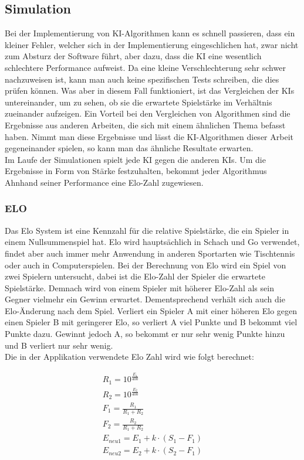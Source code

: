 \documentclass[12pt,a4paper,bibliography=totocnumbered,listof=totocnumbered]{article}
\begin{document}
\subsection{Simulation}
Bei der Implementierung von KI-Algorithmen kann es schnell passieren, dass ein kleiner Fehler, welcher sich in der Implementierung eingeschlichen hat, 
zwar nicht zum Absturz der Software führt, aber dazu, dass die KI eine wesentlich schlechtere Performance aufweist. Da eine kleine Verschlechterung 
sehr schwer nachzuweisen ist, kann man auch keine spezifischen Tests schreiben, die dies prüfen können. Was aber in diesem Fall funktioniert, 
ist das Vergleichen der KIs untereinander, um zu sehen, ob sie die erwartete Spielstärke im Verhältnis zueinander aufzeigen.
Ein Vorteil bei den Vergleichen von Algorithmen sind die Ergebnisse aus anderen Arbeiten, die sich mit einem ähnlichen Thema befasst haben.
Nimmt man diese Ergebnisse und lässt die KI-Algorithmen dieser Arbeit gegeneinander spielen, so kann man das ähnliche Resultate erwarten.
\\
Im Laufe der Simulationen spielt jede KI gegen die anderen KIs. Um die Ergebnisse in Form von Stärke festzuhalten, bekommt jeder Algorithmus Ahnhand
seiner Performance eine Elo-Zahl zugewiesen.

\subsubsection{ELO}
Das Elo System ist eine Kennzahl für die relative Spielstärke, die ein Spieler in einem Nullsummenspiel hat. Elo wird hauptsächlich in Schach und Go verwendet,
findet aber auch immer mehr Anwendung in anderen Sportarten wie Tischtennis oder auch in Computerspielen. Bei der Berechnung von Elo wird ein Spiel von zwei 
Spielern untersucht, dabei ist die Elo-Zahl der Spieler die erwartete Spielstärke. Demnach wird von einem Spieler mit höherer Elo-Zahl als sein Gegner
vielmehr ein Gewinn erwartet. Dementsprechend verhält sich auch die Elo-Änderung nach dem Spiel. Verliert ein Spieler A mit einer höheren Elo gegen einen
Spieler B mit geringerer Elo, so verliert A viel Punkte und B bekommt viel Punkte dazu. Gewinnt jedoch A, so bekommt er nur sehr wenig Punkte hinzu und B verliert 
nur sehr wenig. 
\\ 
Die in der Applikation verwendete Elo Zahl wird wie folgt berechnet:

\begin{align}
    R_1 = 10^{\frac{E_1}{400}} \\ 
    R_2 = 10^{\frac{E_2}{400}} \\
    F_1 = \frac{R_1}{R_1+R_2} \\ 
    F_2 = \frac{R_2}{R_1+R_2} \\
    E_{neu1} = E_1 + k \cdot (S_1 - F_1) \\ 
    E_{neu2} = E_2 + k \cdot (S_2 - F_1)  
\end{align}
\end{document}
